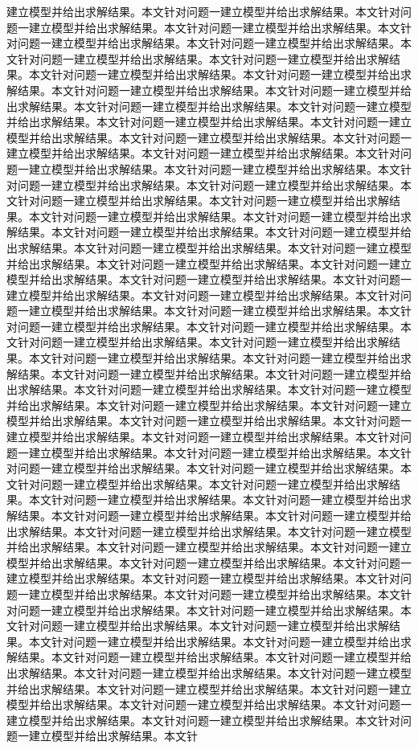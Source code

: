 建立模型并给出求解结果。本文针对问题一建立模型并给出求解结果。本文针对问题一建立模型并给出求解结果。本文针对问题一建立模型并给出求解结果。本文针对问题一建立模型并给出求解结果。本文针对问题一建立模型并给出求解结果。本文针对问题一建立模型并给出求解结果。本文针对问题一建立模型并给出求解结果。本文针对问题一建立模型并给出求解结果。本文针对问题一建立模型并给出求解结果。本文针对问题一建立模型并给出求解结果。本文针对问题一建立模型并给出求解结果。本文针对问题一建立模型并给出求解结果。本文针对问题一建立模型并给出求解结果。本文针对问题一建立模型并给出求解结果。本文针对问题一建立模型并给出求解结果。本文针对问题一建立模型并给出求解结果。本文针对问题一建立模型并给出求解结果。本文针对问题一建立模型并给出求解结果。本文针对问题一建立模型并给出求解结果。本文针对问题一建立模型并给出求解结果。本文针对问题一建立模型并给出求解结果。本文针对问题一建立模型并给出求解结果。本文针对问题一建立模型并给出求解结果。本文针对问题一建立模型并给出求解结果。本文针对问题一建立模型并给出求解结果。本文针对问题一建立模型并给出求解结果。本文针对问题一建立模型并给出求解结果。本文针对问题一建立模型并给出求解结果。本文针对问题一建立模型并给出求解结果。本文针对问题一建立模型并给出求解结果。本文针对问题一建立模型并给出求解结果。本文针对问题一建立模型并给出求解结果。本文针对问题一建立模型并给出求解结果。本文针对问题一建立模型并给出求解结果。本文针对问题一建立模型并给出求解结果。本文针对问题一建立模型并给出求解结果。本文针对问题一建立模型并给出求解结果。本文针对问题一建立模型并给出求解结果。本文针对问题一建立模型并给出求解结果。本文针对问题一建立模型并给出求解结果。本文针对问题一建立模型并给出求解结果。本文针对问题一建立模型并给出求解结果。本文针对问题一建立模型并给出求解结果。本文针对问题一建立模型并给出求解结果。本文针对问题一建立模型并给出求解结果。本文针对问题一建立模型并给出求解结果。本文针对问题一建立模型并给出求解结果。本文针对问题一建立模型并给出求解结果。本文针对问题一建立模型并给出求解结果。本文针对问题一建立模型并给出求解结果。本文针对问题一建立模型并给出求解结果。本文针对问题一建立模型并给出求解结果。本文针对问题一建立模型并给出求解结果。本文针对问题一建立模型并给出求解结果。本文针对问题一建立模型并给出求解结果。本文针对问题一建立模型并给出求解结果。本文针对问题一建立模型并给出求解结果。本文针对问题一建立模型并给出求解结果。本文针对问题一建立模型并给出求解结果。本文针对问题一建立模型并给出求解结果。本文针对问题一建立模型并给出求解结果。本文针对问题一建立模型并给出求解结果。本文针对问题一建立模型并给出求解结果。本文针对问题一建立模型并给出求解结果。本文针对问题一建立模型并给出求解结果。本文针对问题一建立模型并给出求解结果。本文针对问题一建立模型并给出求解结果。本文针对问题一建立模型并给出求解结果。本文针对问题一建立模型并给出求解结果。本文针对问题一建立模型并给出求解结果。本文针对问题一建立模型并给出求解结果。本文针对问题一建立模型并给出求解结果。本文针对问题一建立模型并给出求解结果。本文针对问题一建立模型并给出求解结果。本文针对问题一建立模型并给出求解结果。本文针对问题一建立模型并给出求解结果。本文针对问题一建立模型并给出求解结果。本文针对问题一建立模型并给出求解结果。本文针对问题一建立模型并给出求解结果。本文针对问题一建立模型并给出求解结果。本文针对问题一建立模型并给出求解结果。本文针对问题一建立模型并给出求解结果。本文针对问题一建立模型并给出求解结果。本文针对问题一建立模型并给出求解结果。本文针对问题一建立模型并给出求解结果。本文针对问题一建立模型并给出求解结果。本文针对问题一建立模型并给出求解结果。本文针